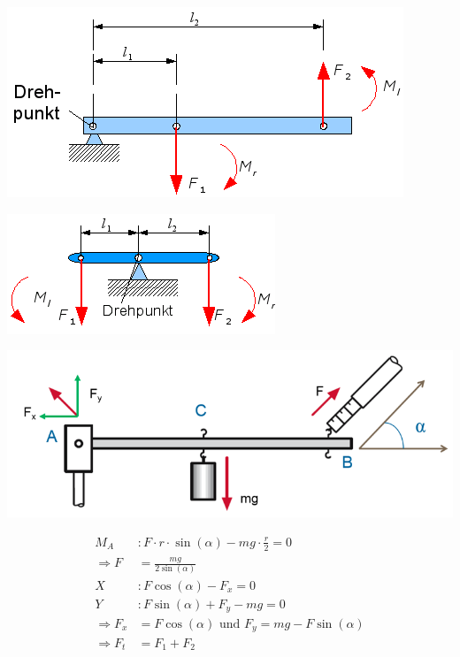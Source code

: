 \begin{minipage}[h!]{0.5\linewidth}
	\includegraphics[width=0.8\linewidth]{images/hebel_einseitig}
\end{minipage}
\hfill
\begin{minipage}[h!]{0.5\linewidth}
	\includegraphics[width=0.8\linewidth]{images/hebel_zweiseitig}
\end{minipage}



\begin{minipage}[h!]{0.5\linewidth}
\includegraphics[width=0.9\linewidth]{images/hebel}
\end{minipage}
\hfill
\begin{minipage}[h!]{0.5\linewidth}
	
	\begin{align*}
	M_A &:	F  \cdot r \cdot  \sin(\alpha) - m g \cdot \frac{r}{2} = 0 \\
	\Rightarrow F &= \frac{mg}{2 \sin(\alpha)} \\
	X&:	F \cos(\alpha) - F_x = 0 \\ 
	Y&:	F \sin(\alpha) + F_y - m g = 0 \\ 
	\Rightarrow F_x &= F \cos(\alpha) \text{ und } F_y = mg - F \sin(\alpha) \\
	\Rightarrow F_{t} &= F_1 + F_2 \\
	\end{align*}
	
\end{minipage}